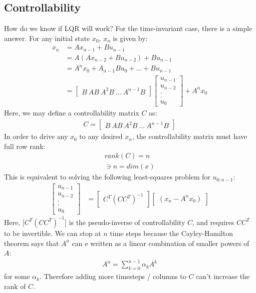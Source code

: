 \subsection{Controllability}
How do we know if LQR will work? For the time-invariant case, there is a simple answer. For any initial state $x_0$, $x_n$ is given by:
\begin{align}
    x_n &= A x_{n-1} + B u_{n-1} \\
    &= A (Ax_{n-2} + B u_{n-2}) + B u_{n-1} \\
    &= A^n x_0 + A_{n-1} B u_0 + ... + B u_{n-1}\\
    &= \begin{bmatrix}
        B \ AB \ A^2 B \ ... \ A^{n-1} B
    \end{bmatrix}
    \begin{bmatrix}
        u_{n-1} \\
        u_{n-2} \\
        . \\
        . \\
        u_0
    \end{bmatrix}
    +
    A^n x_0
\end{align}
Here, we may define a controllability matrix $C$ as:
\begin{align}
    C = \begin{bmatrix}
        B \ AB \ A^2 B \ ... \ A^{n-1} B
    \end{bmatrix}
\end{align}
In order to drive any $x_0$ to any desired $x_n$, the controllability matrix must have full row rank:
\begin{align}
    rank(C) = n \\
    \ni n = dim(x)
\end{align}
This is equivalent to solving the following least-squares problem for $u_{0:n-1}$:
\begin{align}
    \begin{bmatrix}
        u_{n-1} \\
        u_{n-2} \\
        . \\
        . \\
        u_0
    \end{bmatrix}
    &=
    \begin{bmatrix}
        C^T (C C^T)^{-1}
    \end{bmatrix}
    \begin{bmatrix}
        (x_n - A^n x_0)
    \end{bmatrix}
\end{align}
Here, $\big[ C^T (C C^T)^{-1} \big]$ is the pseudo-inverse of controllability $C$, and requires $C C^T$ to be invertible.
We can stop at $n$ time steps because the Cayley-Hamilton theorem says that $A^n$ can e written as a linear combination of smaller powers of $A$:
\begin{align}
    A^n = \sum_{k=0}^{n-1} \alpha_k A^k
\end{align}
for some $\alpha_k$.
Therefore adding more timesteps / columns to $C$ can't increase the rank of $C$.
